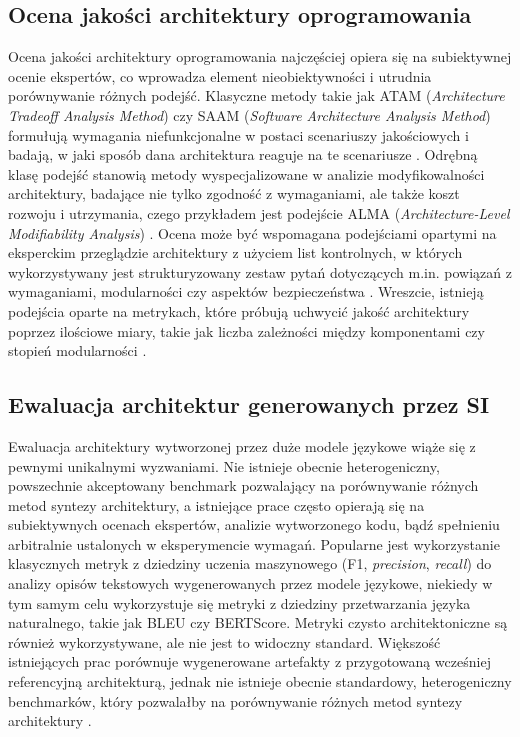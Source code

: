 \subsection{Ocena jakości architektury oprogramowania}

Ocena jakości architektury oprogramowania najczęściej opiera się na subiektywnej ocenie ekspertów, co wprowadza element nieobiektywności i utrudnia porównywanie różnych podejść. Klasyczne metody takie jak ATAM (\emph{Architecture Tradeoff Analysis Method}) czy SAAM (\emph{Software Architecture Analysis Method}) formułują wymagania niefunkcjonalne w postaci scenariuszy jakościowych i badają, w jaki sposób dana architektura reaguje na te scenariusze \cite{kazman_atam_2000, kazman_saam_1944}. Odrębną klasę podejść stanowią metody wyspecjalizowane w analizie modyfikowalności architektury, badające nie tylko zgodność z wymaganiami, ale także koszt rozwoju i utrzymania, czego przykładem jest podejście ALMA (\emph{Architecture-Level Modifiability Analysis}) \cite{bengtsson_alma_2004}. Ocena może być wspomagana podejściami opartymi na eksperckim przeglądzie architektury z użyciem list kontrolnych, w których wykorzystywany jest strukturyzowany zestaw pytań dotyczących m.in. powiązań z wymaganiami, modularności czy aspektów bezpieczeństwa \cite{uta_design_review_checklist, cianca_eval_arch_2000}. Wreszcie, istnieją podejścia oparte na metrykach, które próbują uchwycić jakość architektury poprzez ilościowe miary, takie jak liczba zależności między komponentami czy stopień modularności \cite{bengtsson_alma_2004, add, ford2021}.

\subsection{Ewaluacja architektur generowanych przez SI}

Ewaluacja architektury wytworzonej przez duże modele językowe wiąże się z pewnymi unikalnymi wyzwaniami. Nie istnieje obecnie heterogeniczny, powszechnie akceptowany benchmark pozwalający na porównywanie różnych metod syntezy architektury, a istniejące prace często opierają się na subiektywnych ocenach ekspertów, analizie wytworzonego kodu, bądź spełnieniu arbitralnie ustalonych w eksperymencie wymagań. Popularne jest wykorzystanie klasycznych metryk z dziedziny uczenia maszynowego (F1, \emph{precision}, \emph{recall}) do analizy opisów tekstowych wygenerowanych przez modele językowe, niekiedy w tym samym celu wykorzystuje się metryki z dziedziny przetwarzania języka naturalnego, takie jak BLEU czy BERTScore. Metryki czysto architektoniczne są również wykorzystywane, ale nie jest to widoczny standard. Większość istniejących prac porównuje wygenerowane artefakty z przygotowaną wcześniej referencyjną architekturą, jednak nie istnieje obecnie standardowy, heterogeniczny benchmarków, który pozwalałby na porównywanie różnych metod syntezy architektury \cite{schmidSoftwareArchitectureMeets2025}.

